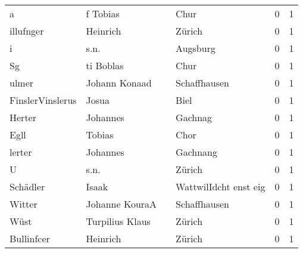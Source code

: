 \documentclass[10pt,a4paper,landscape]{article}
\begin{document}
\begin{longtable}{llllrr}
                        a &                           f Tobias &             &                                        Chur &          0 &         1 \\
                illufnger &                           Heinrich &             &                                      Zürich &          0 &         1 \\
                        i &                               s.n. &             &                                    Augsburg &          0 &         1 \\
                       Sg &                          ti Boblas &             &                                        Chur &          0 &         1 \\
                    ulmer &                      Johann Konaad &             &                                Schaffhausen &          0 &         1 \\
         FinslerVinslerus &                              Josua &             &                                        Biel &          0 &         1 \\
                   Herter &                           Johannes &             &                                     Gachnag &          0 &         1 \\
                     Egll &                             Tobias &             &                                        Chor &          0 &         1 \\
                   lerter &                           Johannes &             &                                    Gachnang &          0 &         1 \\
                        U &                               s.n. &             &                                      Zürich &          0 &         1 \\
                 Schädler &                              Isaak &             &                       WattwilIdcht enst eig &          0 &         1 \\
                   Witter &                     Johanne KouraA &             &                                Schaffhausen &          0 &         1 \\
                     Wüst &                    Turpilius Klaus &             &                                      Zürich &          0 &         1 \\
               Bullinfcer &                           Heinrich &             &                                      Zürich &          0 &         1 \\

\end{longtable}
\end{document}
